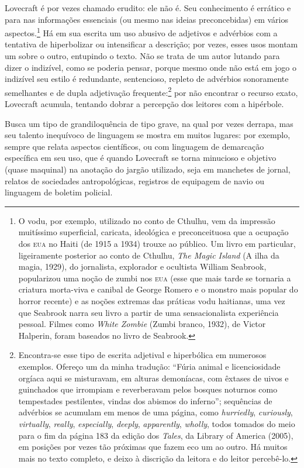 Lovecraft é por vezes chamado erudito: ele não é. Seu
conhecimento é errático e para nas informações essenciais (ou mesmo nas
ideias preconcebidas) em vários aspectos.\footnote{O vodu, por exemplo,
  utilizado no conto de Cthulhu, vem da impressão muitíssimo
  superficial, caricata, ideológica e preconceituosa que a ocupação dos
  \textsc{eua} no Haiti (de 1915 a 1934) trouxe ao público. Um livro em
  particular, ligeiramente posterior ao conto de Cthulhu, \emph{The
  Magic Island} (A ilha da magia, 1929), do jornalista, explorador e ocultista William
  Seabrook, popularizou uma noção de zumbi nos \textsc{eua}
  (esse que mais tarde se tornaria a criatura morta-viva e canibal de
  George Romero e o monstro mais popular do horror recente) e as noções
  extremas das práticas vodu haitianas, uma vez que Seabrook narra seu
  livro a partir de uma sensacionalista experiência pessoal. Filmes como
  \emph{White Zombie} (Zumbi branco, 1932), de Victor Halperin, foram baseados no
  livro de Seabrook.} Há em sua escrita um uso abusivo de adjetivos e
advérbios com a tentativa de hiperbolizar ou intensificar a descrição;
por vezes, esses usos montam um sobre o outro, entupindo o texto. Não se
trata de um autor lutando para dizer o indizível, como se poderia
pensar, porque mesmo onde não está em jogo o indizível seu estilo é
redundante, sentencioso, repleto de advérbios sonoramente semelhantes e
de dupla adjetivação frequente:\footnote{Encontra-se esse tipo de escrita
  adjetival e hiperbólica em numerosos exemplos. Ofereço um da minha
  tradução: ``Fúria animal e licenciosidade orgíaca aqui se misturavam,
  em alturas demoníacas, com êxtases de uivos e guinchados que irrompiam
  e reverberavam pelos bosques noturnos como tempestades pestilentes,
  vindas dos abismos do inferno''; sequências de advérbios se acumulam
  em menos de uma página, como \emph{hurriedly}, \emph{curiously},
  \emph{virtually}, \emph{really}, \emph{especially}, \emph{deeply},
  \emph{apparently}, \emph{wholly}, todos tomados do meio para o fim da
  página 183 da edição dos \emph{Tales}, da Library of America (2005),
  em posições por vezes tão próximas que fazem eco um ao outro. Há
  muitos mais no texto completo, e deixo à discrição da leitora e do
  leitor percebê-lo.} por não encontrar o recurso exato, Lovecraft
acumula, tentando dobrar a percepção dos leitores com a hipérbole.

Busca um tipo de grandiloquência de tipo grave, na qual por vezes
derrapa, mas seu talento inequívoco de linguagem se mostra em muitos
lugares: por exemplo, sempre que relata aspectos científicos, ou com
linguagem de demarcação específica em seu uso, que é quando Lovecraft se
torna minucioso e objetivo (quase maquinal) na anotação do jargão
utilizado, seja em manchetes de jornal, relatos de sociedades
antropológicas, registros de equipagem de navio ou linguagem de boletim
policial.

